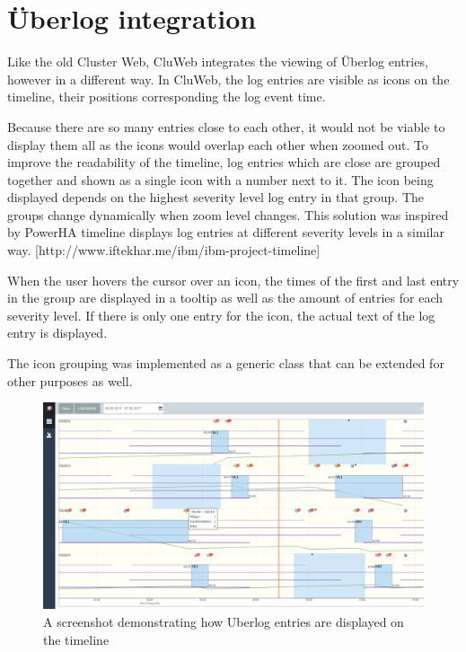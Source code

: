 \section{Überlog integration}
Like the old Cluster Web, CluWeb integrates the viewing of Überlog entries, however in a different way. In CluWeb, the log entries are visible as icons on the timeline, their positions corresponding the log event time. 

Because there are so many entries close to each other, it would not be viable to display them all as the icons would overlap each other when zoomed out. To improve the readability of the timeline, log entries which are close are grouped together and shown as a single icon with a number next to it. The icon being displayed depends on the highest severity level log entry in that group. The groups change dynamically when zoom level changes. This solution was inspired by PowerHA timeline displays log entries at different severity levels in a similar way. [http://www.iftekhar.me/ibm/ibm-project-timeline]

When the user hovers the cursor over an icon, the times of the first and last entry in the group are displayed in a tooltip as well as the amount of entries for each severity level. If there is only one entry for the icon, the actual text of the log entry is displayed.

The icon grouping was implemented as a generic class that can be extended for other purposes as well.
 
\begin{figure}[ht]
  \begin{center}
    \includegraphics*[width=1\textwidth]{cluweb_uberlog}
  \end{center}
  \caption{A screenshot demonstrating how Uberlog entries are displayed on the timeline}
  \label{fig:cluweb_uberlog}
\end{figure}
